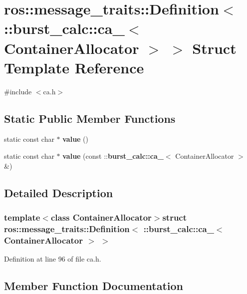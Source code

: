 \section{ros\-:\-:message\-\_\-traits\-:\-:\-Definition$<$ \-:\-:burst\-\_\-calc\-:\-:ca\-\_\-$<$ \-Container\-Allocator $>$ $>$ \-Struct \-Template \-Reference}
\label{structros_1_1message__traits_1_1Definition_3_01_1_1burst__calc_1_1ca___3_01ContainerAllocator_01_4_01_4}


{\ttfamily \#include $<$ca.\-h$>$}

\subsection*{\-Static \-Public \-Member \-Functions}
\begin{DoxyCompactItemize}
\item 
static const char $\ast$ {\bf value} ()
\item 
static const char $\ast$ {\bf value} (const \-::{\bf burst\-\_\-calc\-::ca\-\_\-}$<$ \-Container\-Allocator $>$ \&)
\end{DoxyCompactItemize}


\subsection{\-Detailed \-Description}
\subsubsection*{template$<$class Container\-Allocator$>$struct ros\-::message\-\_\-traits\-::\-Definition$<$ \-::burst\-\_\-calc\-::ca\-\_\-$<$ Container\-Allocator $>$ $>$}



\-Definition at line 96 of file ca.\-h.



\subsection{\-Member \-Function \-Documentation}
